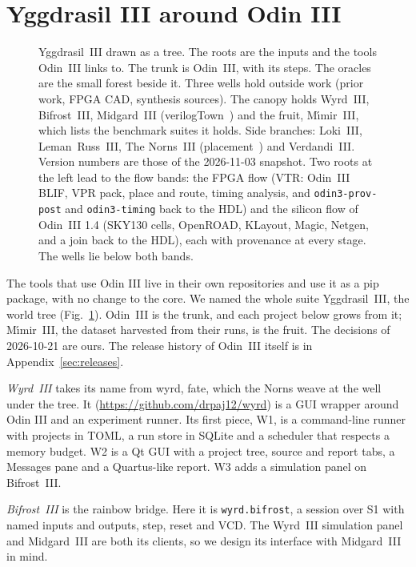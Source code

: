 \documentclass[conference]{IEEEtran}
\newcommand{\code}[1]{\texttt{#1}}
\begin{document}
\section{Yggdrasil III around Odin III}
\label{sec:v1plan}

\begin{figure}[tp]
\centering
\odinfit{\textwidth}{}
\caption{Yggdrasil~III drawn as a tree. The roots are the inputs and the tools Odin~III links to. The trunk is Odin~III, with its steps. The oracles are the small forest beside it. Three wells hold outside work (prior work, FPGA CAD, synthesis sources). The canopy holds Wyrd~III, Bifrost~III, Midgard~III (verilogTown~\protect{}) and the fruit, M\'{\i}mir~III, which lists the benchmark suites it holds. Side branches: Loki~III, Leman~Russ~III, The Norns~III (placement~\protect{}) and Verdandi~III. Version numbers are those of the 2026-11-03 snapshot. Two roots at the left lead to the flow bands: the FPGA flow (VTR: Odin~III BLIF, VPR pack, place and route, timing analysis, and \code{odin3-prov-post} and \code{odin3-timing} back to the HDL) and the silicon flow of Odin~III 1.4 (SKY130 cells, OpenROAD, KLayout, Magic, Netgen, and a join back to the HDL), each with provenance at every stage. The wells lie below both bands.}
\label{fig:yggdrasil}
\end{figure}

The tools that use Odin III live in their own repositories and use it as a pip package, with no
change to the core. We named the whole suite Yggdrasil~III, the world tree
(Fig.~\ref{fig:yggdrasil}). Odin~III is the trunk, and each project below grows from it;
M\'{\i}mir~III, the dataset harvested from their runs, is the fruit. The decisions of
2026-10-21 are ours. The release history of Odin~III itself is in Appendix~\ref{sec:releases}.

\emph{Wyrd~III} takes its name from wyrd, fate, which the Norns weave at the well under the tree. It
(\url{https://github.com/drpaj12/wyrd}) is a GUI wrapper around Odin III and an experiment
runner. Its first piece, W1, is a command-line runner with projects in TOML, a run store
in SQLite and a scheduler that respects a memory budget. W2 is a Qt GUI with a project tree,
source and report tabs, a Messages pane and a Quartus-like report. W3 adds a simulation panel on
Bifrost~III.

\emph{Bifrost~III} is the rainbow bridge. Here it is \code{wyrd.bifrost}, a session over S1 with
named inputs and outputs, step, reset and VCD. The Wyrd~III simulation panel and Midgard~III are both
its clients, so we design its interface with Midgard~III in mind.
\end{document}
